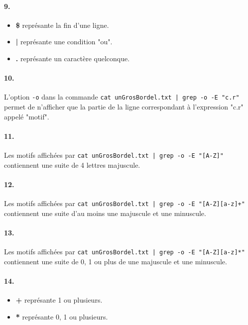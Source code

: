 \paragraph{9.}
\begin{itemize}
  \item \textbf{\$} représante la fin d'une ligne.
  \item \textbf{|} représante une condition "ou".
  \item \textbf{.} représante un caractère quelconque.
\end{itemize}

\paragraph{10.}
L'option \texttt{-o} dans la commande \texttt{cat unGrosBordel.txt | grep -o -E "c.r"} permet de n’afficher que la partie de la ligne correspondant à l’expression "c.r" appelé "motif".

\paragraph{11.}
Les motifs affichées par \texttt{cat unGrosBordel.txt | grep -o -E "[A-Z]"} contiennent une suite de 4 lettres majuscule.

\paragraph{12.}
Les motifs affichées par \texttt{cat unGrosBordel.txt | grep -o -E "[A-Z][a-z]+"} contiennent une suite d'au moins une majuscule et une minuscule.

\paragraph{13.}
Les motifs affichées par \texttt{cat unGrosBordel.txt | grep -o -E "[A-Z][a-z]*"} contiennent une suite de 0, 1 ou plus de une majuscule et une minuscule.

\paragraph{14.}
\begin{itemize}
  \item \textbf{+} représante 1 ou plusieurs.
  \item \textbf{*} représante 0, 1 ou plusieurs.
\end{itemize}

